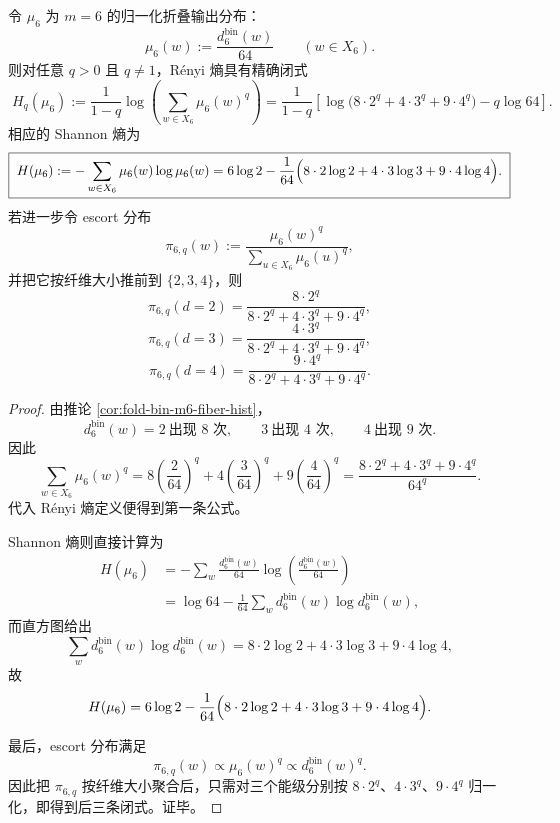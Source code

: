 \begin{theorem}\label{thm:conclusion-window6-full-renyi-thermodynamics-closed}
令 \(\mu_6\) 为 \(m=6\) 的归一化折叠输出分布：
\[
\mu_6(w):=\frac{d_6^{\mathrm{bin}}(w)}{64}
\qquad (w\in X_6).
\]
则对任意 \(q>0\) 且 \(q\neq 1\)，R\'enyi 熵具有精确闭式
\[
\boxed{\;
H_q(\mu_6)
:=
\frac{1}{1-q}\log\!\left(\sum_{w\in X_6}\mu_6(w)^q\right)
=
\frac{1}{1-q}
\left[
\log\!\bigl(8\cdot 2^q+4\cdot 3^q+9\cdot 4^q\bigr)-q\log 64
\right].\;}
\]
相应的 Shannon 熵为
\[
\boxed{\;
H(\mu_6)
:=
-\sum_{w\in X_6}\mu_6(w)\log\mu_6(w)
=
6\log 2
-\frac{1}{64}\Bigl(8\cdot 2\log 2+4\cdot 3\log 3+9\cdot 4\log 4\Bigr).\;}
\]
若进一步令 escort 分布
\[
\pi_{6,q}(w):=\frac{\mu_6(w)^q}{\sum_{u\in X_6}\mu_6(u)^q},
\]
并把它按纤维大小推前到 \(\{2,3,4\}\)，则
\[
\boxed{\;
\pi_{6,q}(d=2)=\frac{8\cdot 2^q}{8\cdot 2^q+4\cdot 3^q+9\cdot 4^q},\;}
\]
\[
\boxed{\;
\pi_{6,q}(d=3)=\frac{4\cdot 3^q}{8\cdot 2^q+4\cdot 3^q+9\cdot 4^q},\;}
\]
\[
\boxed{\;
\pi_{6,q}(d=4)=\frac{9\cdot 4^q}{8\cdot 2^q+4\cdot 3^q+9\cdot 4^q}.\;}
\]
\end{theorem}
\begin{proof}
由推论 \ref{cor:fold-bin-m6-fiber-hist}，
\[
d_6^{\mathrm{bin}}(w)=2\ \text{出现 }8\text{ 次},\qquad
3\ \text{出现 }4\text{ 次},\qquad
4\ \text{出现 }9\text{ 次}.
\]
因此
\[
\sum_{w\in X_6}\mu_6(w)^q
=
8\left(\frac{2}{64}\right)^q
+4\left(\frac{3}{64}\right)^q
+9\left(\frac{4}{64}\right)^q
=
\frac{8\cdot 2^q+4\cdot 3^q+9\cdot 4^q}{64^q}.
\]
代入 R\'enyi 熵定义便得到第一条公式。

Shannon 熵则直接计算为
\[
\begin{aligned}
H(\mu_6)
&=
-\sum_{w}\frac{d_6^{\mathrm{bin}}(w)}{64}
\log\!\left(\frac{d_6^{\mathrm{bin}}(w)}{64}\right)\\
&=
\log 64-\frac{1}{64}\sum_{w}d_6^{\mathrm{bin}}(w)\log d_6^{\mathrm{bin}}(w),
\end{aligned}
\]
而直方图给出
\[
\sum_{w}d_6^{\mathrm{bin}}(w)\log d_6^{\mathrm{bin}}(w)
=
8\cdot 2\log 2+4\cdot 3\log 3+9\cdot 4\log 4,
\]
故
\[
H(\mu_6)
=
6\log 2-\frac{1}{64}\Bigl(8\cdot 2\log 2+4\cdot 3\log 3+9\cdot 4\log 4\Bigr).
\]

最后，escort 分布满足
\[
\pi_{6,q}(w)\propto \mu_6(w)^q\propto d_6^{\mathrm{bin}}(w)^q.
\]
因此把 \(\pi_{6,q}\) 按纤维大小聚合后，只需对三个能级分别按 \(8\cdot 2^q\)、\(4\cdot 3^q\)、\(9\cdot 4^q\) 归一化，即得到后三条闭式。证毕。
\end{proof}

